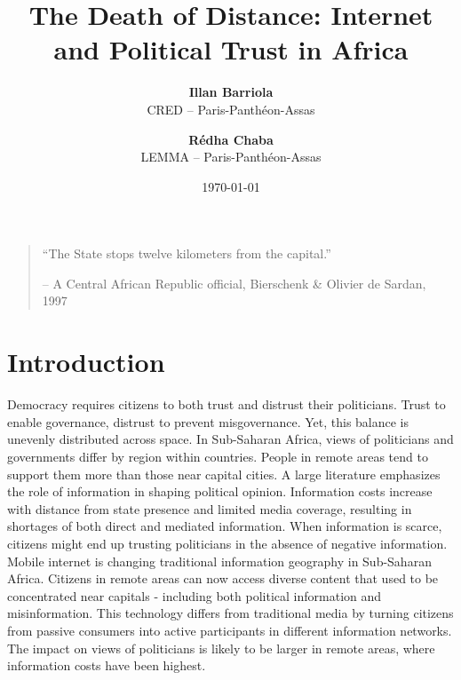 \documentclass[11pt]{article}
\begin{document}
\title{The Death of Distance: Internet and Political Trust in Africa  \\  }

\author{
\textbf{Illan Barriola} \\ CRED -- Paris-Panthéon-Assas \\
\and 
\textbf{R\'{e}dha Chaba} \\ LEMMA -- Paris-Panthéon-Assas  \\
}

\date{\today}

\maketitle

\newpage

\begin{quotation}
\noindent ``The State stops twelve kilometers from the capital.'' 

\smallskip

\hfill -- A Central African Republic official, Bierschenk \& Olivier de Sardan, 1997 
\end{quotation}

\section{Introduction}



Democracy requires citizens to both trust and distrust their politicians. Trust to enable governance, distrust to prevent misgovernance.
Yet, this balance is unevenly distributed across space.
In Sub-Saharan Africa, views of politicians and governments differ by region within countries.
People in remote areas tend to support them more than those near capital cities.
A large literature emphasizes the role of information in shaping political opinion.
Information costs increase with distance from state presence and limited media coverage, resulting in shortages of both direct and mediated information.
When information is scarce, citizens might end up trusting politicians in the absence of negative information.\\

Mobile internet is changing traditional information geography in Sub-Saharan Africa. Citizens in remote areas can now access diverse content that used to be concentrated near capitals - including both political information and misinformation.
This technology differs from traditional media by turning citizens from passive consumers into active participants in different information networks.
The impact on views of politicians is likely to be larger in remote areas, where information costs have been highest.\\
\end{document}
